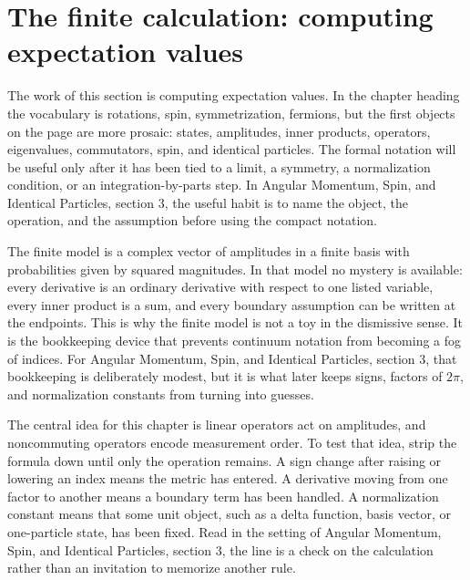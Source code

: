 \section{The finite calculation: computing expectation values}













The work of this section is computing expectation values.  In the chapter heading the vocabulary is rotations, spin, symmetrization, fermions, but the first objects on the page are more prosaic: states, amplitudes, inner products, operators, eigenvalues, commutators, spin, and identical particles.  The formal notation will be useful only after it has been tied to a limit, a symmetry, a normalization condition, or an integration-by-parts step.  In Angular Momentum, Spin, and Identical Particles, section 3, the useful habit is to name the object, the operation, and the assumption before using the compact notation.

The finite model is a complex vector of amplitudes in a finite basis with probabilities given by squared magnitudes.  In that model no mystery is available: every derivative is an ordinary derivative with respect to one listed variable, every inner product is a sum, and every boundary assumption can be written at the endpoints.  This is why the finite model is not a toy in the dismissive sense.  It is the bookkeeping device that prevents continuum notation from becoming a fog of indices.  For Angular Momentum, Spin, and Identical Particles, section 3, that bookkeeping is deliberately modest, but it is what later keeps signs, factors of \(2\pi\), and normalization constants from turning into guesses.

The central idea for this chapter is linear operators act on amplitudes, and noncommuting operators encode measurement order.  To test that idea, strip the formula down until only the operation remains.  A sign change after raising or lowering an index means the metric has entered.  A derivative moving from one factor to another means a boundary term has been handled.  A normalization constant means that some unit object, such as a delta function, basis vector, or one-particle state, has been fixed.  Read in the setting of Angular Momentum, Spin, and Identical Particles, section 3, the line is a check on the calculation rather than an invitation to memorize another rule.

